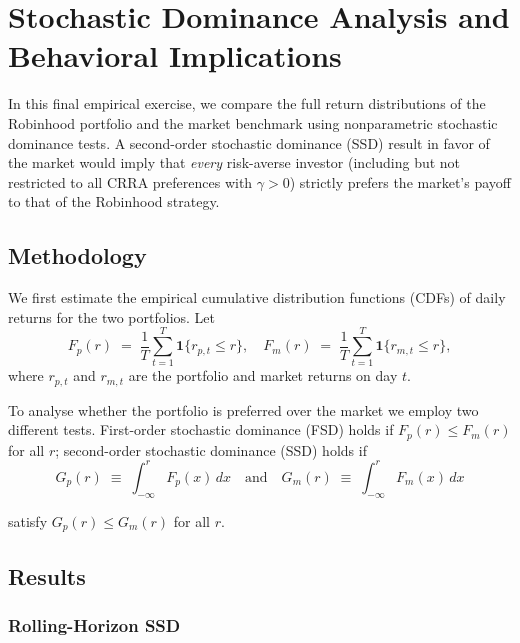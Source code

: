 \section{Stochastic Dominance Analysis and Behavioral Implications}

In this final empirical exercise, we compare the full return distributions of the Robinhood portfolio and the market benchmark using nonparametric stochastic dominance tests.  
A second-order stochastic dominance (SSD) result in favor of the market would imply that \emph{every} risk-averse investor 
(including but not restricted to all CRRA preferences with \(\gamma>0\)) strictly prefers the market's payoff to that of the Robinhood strategy.

\subsection{Methodology}
We first estimate the empirical cumulative distribution functions (CDFs) of daily returns for the two portfolios.  Let
\begin{equation}    
    F_{p}(r) \;=\; \frac{1}{T}\sum_{t=1}^{T}\mathbf{1}\{r_{p,t}\le r\},
    \quad
    F_{m}(r) \;=\; \frac{1}{T}\sum_{t=1}^{T}\mathbf{1}\{r_{m,t}\le r\},
\end{equation}
where \(r_{p,t}\) and \(r_{m,t}\) are the portfolio and market returns on day \(t\).  

To analyse whether the portfolio is preferred over the market we employ two different tests.
First-order stochastic dominance (FSD) holds if \(F_{p}(r)\le F_{m}(r)\) for all \(r\); 
second-order stochastic dominance (SSD) holds if
\begin{equation}    
    G_{p}(r) \;\equiv\;\int_{-\infty}^{r}F_{p}(x)\,dx
    \quad\text{and}\quad
    G_{m}(r)\;\equiv\;\int_{-\infty}^{r}F_{m}(x)\,dx
\end{equation}

satisfy \(G_{p}(r)\le G_{m}(r)\) for all \(r\).


\subsection{Results}
\subsubsection{Rolling-Horizon SSD}
